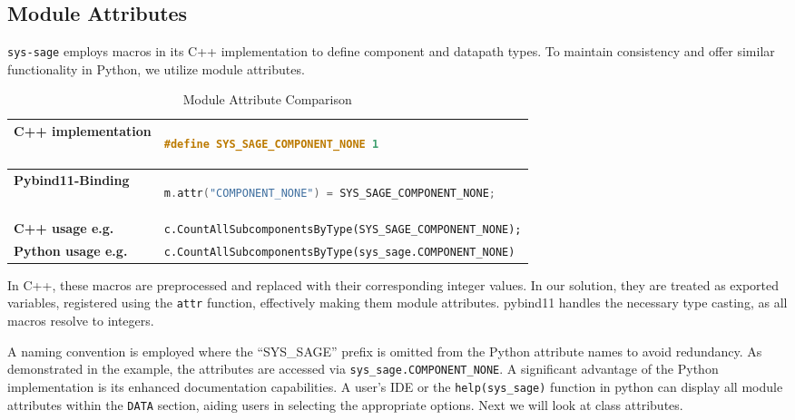 \subsection{Module Attributes}

\verb|sys-sage| employs macros in its C++ implementation to define component and datapath types. To maintain consistency and offer similar functionality in Python, we utilize module attributes. 

\begin{table}[htbp]
\centering
\begin{tabular}{|l|l|}
\hline
\textbf{C++ implementation} & \begin{lstlisting}[language=C++]
#define SYS_SAGE_COMPONENT_NONE 1 
\end{lstlisting} \\ \hline
\textbf{Pybind11-Binding} & \begin{lstlisting}[language=C++]
m.attr("COMPONENT_NONE") = SYS_SAGE_COMPONENT_NONE;
\end{lstlisting} \\ \hline
\textbf{C++ usage e.g.} & \verb|c.CountAllSubcomponentsByType(SYS_SAGE_COMPONENT_NONE);| \\ \hline
\textbf{Python usage e.g.} & \verb|c.CountAllSubcomponentsByType(sys_sage.COMPONENT_NONE)| \\ \hline
\end{tabular}
\caption{Module Attribute Comparison}
\label{tab:module_attributes}
\end{table}

In C++, these macros are preprocessed and replaced with their corresponding integer values. In our solution, they are treated as exported variables, registered using the \verb|attr| function, effectively making them module attributes. pybind11 handles the necessary type casting, as all macros resolve to integers.\cite{pybind11-docu}

A naming convention is employed where the “SYS\_SAGE” prefix is omitted from the Python attribute names to avoid redundancy. As demonstrated in the example, the attributes are accessed via \verb|sys_sage.COMPONENT_NONE|.
A significant advantage of the Python implementation is its enhanced documentation capabilities. A user's \ac{IDE} or the \verb|help(sys_sage)| function in python can display all module attributes within the \verb|DATA| section, aiding users in selecting the appropriate options.
\smallskip
Next we will look at class attributes.

